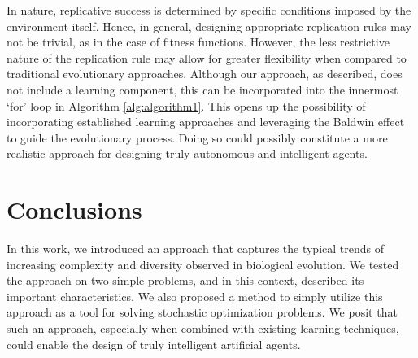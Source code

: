 In nature, replicative success is determined by specific conditions imposed by the environment itself. Hence, in general, designing appropriate replication rules may not be trivial, as in the case of fitness functions. However, the less restrictive nature of the replication rule may allow for greater flexibility when compared to traditional evolutionary approaches. 
Although our approach, as described, does not include a learning component, this can be incorporated into the innermost `for' loop in Algorithm \ref{alg:algorithm1}. This opens up the possibility of incorporating established learning approaches and leveraging the Baldwin effect \cite{baldwin1896new} to guide the evolutionary process. Doing so could possibly constitute a more realistic approach for designing truly autonomous and intelligent agents.

\section{Conclusions}
In this work, we introduced an approach that captures the typical trends of increasing complexity and diversity observed in biological evolution. We tested the approach on two simple problems, and in this context, described its important characteristics. We also proposed a method to simply utilize this approach as a tool for solving stochastic optimization problems. We posit that such an approach, especially when combined with existing learning techniques, could enable the design of truly intelligent artificial agents. 
